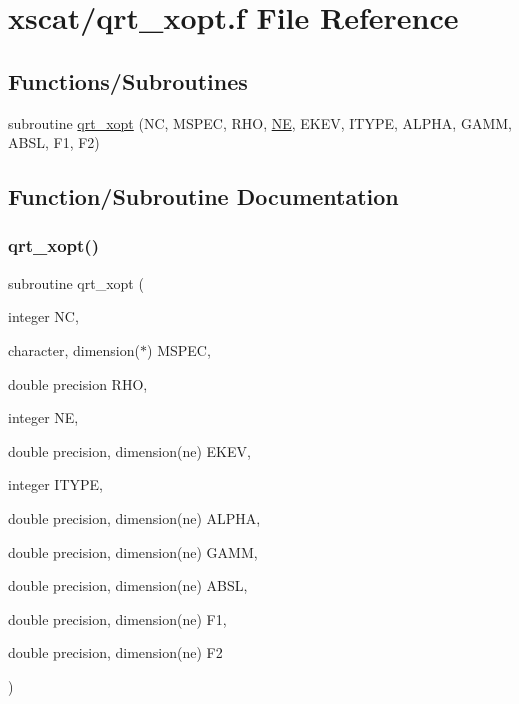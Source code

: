 \hypertarget{qrt__xopt_8f}{}\section{xscat/qrt\+\_\+xopt.f File Reference}
\label{qrt__xopt_8f}
\subsection*{Functions/\+Subroutines}
\begin{DoxyCompactItemize}
\item 
subroutine \hyperlink{qrt__xopt_8f_a81611df2e21aecc189c82e2545effc98}{qrt\+\_\+xopt} (NC, M\+S\+P\+EC, R\+HO, \hyperlink{eval__tab_8h_a5af9139e882aef6c820ae908589a40d6}{NE}, E\+K\+EV, I\+T\+Y\+PE, A\+L\+P\+HA, G\+A\+MM, A\+B\+SL, F1, F2)
\end{DoxyCompactItemize}


\subsection{Function/\+Subroutine Documentation}
\mbox{\label{qrt__xopt_8f_a81611df2e21aecc189c82e2545effc98}} 
\subsubsection{\texorpdfstring{qrt\+\_\+xopt()}{qrt\_xopt()}}
{\footnotesize\ttfamily subroutine qrt\+\_\+xopt (\begin{DoxyParamCaption}\item[{integer}]{NC,  }\item[{character, dimension($\ast$)}]{M\+S\+P\+EC,  }\item[{double precision}]{R\+HO,  }\item[{integer}]{NE,  }\item[{double precision, dimension(ne)}]{E\+K\+EV,  }\item[{integer}]{I\+T\+Y\+PE,  }\item[{double precision, dimension(ne)}]{A\+L\+P\+HA,  }\item[{double precision, dimension(ne)}]{G\+A\+MM,  }\item[{double precision, dimension(ne)}]{A\+B\+SL,  }\item[{double precision, dimension(ne)}]{F1,  }\item[{double precision, dimension(ne)}]{F2 }\end{DoxyParamCaption})}


